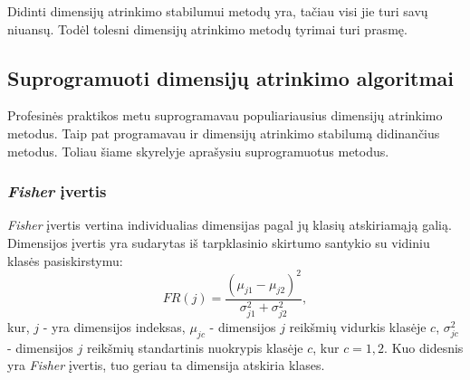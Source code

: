 Didinti dimensijų atrinkimo stabilumui metodų yra, tačiau visi jie turi savų niuansų. Todėl tolesni dimensijų atrinkimo metodų tyrimai turi prasmę. 

\subsection{Suprogramuoti dimensijų atrinkimo algoritmai}

Profesinės praktikos metu suprogramavau populiariausius dimensijų atrinkimo metodus. Taip pat programavau ir dimensijų atrinkimo stabilumą didinančius metodus. Toliau šiame skyrelyje aprašysiu suprogramuotus metodus.

\subsubsection{\textit{Fisher} įvertis}

\textit{Fisher} įvertis vertina individualias dimensijas pagal jų klasių atskiriamąją 
galią. Dimensijos įvertis yra sudarytas iš tarpklasinio skirtumo santykio su 
vidiniu klasės pasiskirstymu:
\begin{equation}
 FR(j) = \frac{(\mu_{j1} - \mu_{j2})^2}{\sigma_{j1}^2 + \sigma_{j2}^2},
\end{equation}
kur, $j$ - yra dimensijos indeksas, $\mu_{jc}$ - dimensijos $j$ reikšmių vidurkis
klasėje $c$, $\sigma_{jc}^2$ - dimensijos $j$ reikšmių standartinis nuokrypis
klasėje $c$, kur $c={1,2}$. Kuo didesnis yra \textit{Fisher} įvertis, tuo geriau ta
dimensija atskiria klases.

